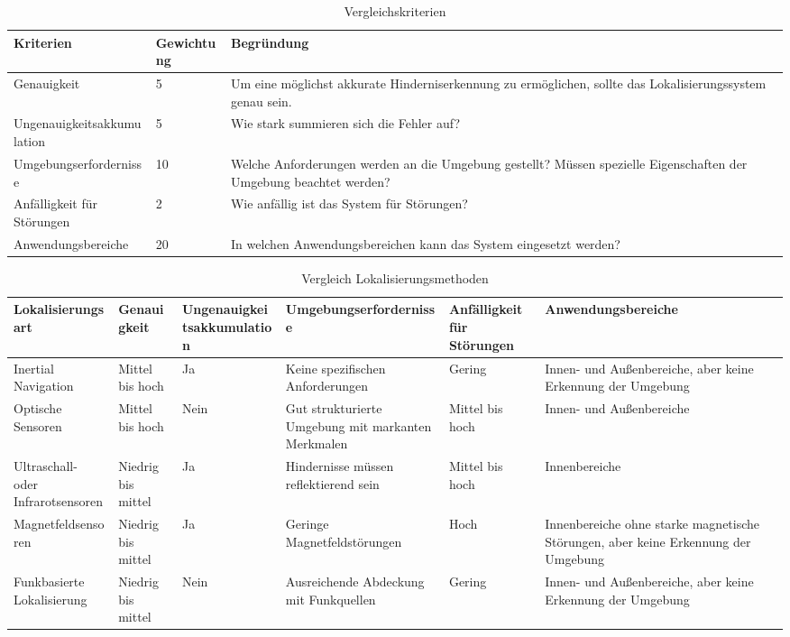 \begin{table}[H]
    \centering
    \begin{tabular}{|p{5cm}|p{5cm}|p{5cm}|}
        \hline
        \textbf{Kriterien} & \textbf{Gewichtung} & \textbf{Begründung} \\
        \hline
        Genauigkeit & 5 & Um eine möglichst akkurate Hinderniserkennung zu ermöglichen, sollte das Lokalisierungssystem genau sein. \\
        \hline
        Ungenauigkeitsakkumulation & 5 & Wie stark summieren sich die Fehler auf? \\
        \hline
        Umgebungserfordernisse & 10 & Welche Anforderungen werden an die Umgebung gestellt? Müssen spezielle Eigenschaften der Umgebung beachtet werden? \\
        \hline
        Anfälligkeit für Störungen & 2 & Wie anfällig ist das System für Störungen? \\
        \hline
        Anwendungsbereiche & 20 & In welchen Anwendungsbereichen kann das System eingesetzt werden? \\
        \hline
    \end{tabular}
    \caption{Vergleichskriterien}
    \label{tab:vergleich-kriterien}
\end{table}

\begin{table}[H]
\begin{center}
   \fontsize{7}{11}\selectfont
    \begin{tabular}{|p{2cm}|p{2cm}|p{2cm}|p{3cm}|p{2cm}|p{3cm}|}
    \hline
    \textbf{Lokalisier\-ungsart} & \textbf{Genauigkeit} & \textbf{Ungenauigkeits\-akkumulation} & \textbf{Umgebungs\-erfordernisse} & \textbf{Anfälligkeit für Störungen} & \textbf{Anwendungsbereiche} \\\hline
    Inertial Navigation & Mittel bis hoch & Ja & Keine spezifischen Anforderungen & Gering & Innen- und Außenbereiche, aber keine Erkennung der Umgebung \\\hline
    Optische Sensoren & Mittel bis hoch & Nein & Gut strukturierte Umgebung mit markanten Merkmalen & Mittel bis hoch & Innen- und Außenbereiche \\\hline
    Ultraschall- oder Infrarotsensoren & Niedrig bis mittel & Ja & Hindernisse müssen reflektierend sein & Mittel bis hoch & Innenbereiche \\\hline
    Magnetfeld\-sensoren & Niedrig bis mittel & Ja & Geringe Magnetfeldstörungen & Hoch & Innenbereiche ohne starke magnetische Störungen, aber keine Erkennung der Umgebung \\\hline
    Funkbasierte Lokalisierung & Niedrig bis mittel & Nein & Ausreichende Abdeckung mit Funkquellen & Gering & Innen- und Außenbereiche, aber keine Erkennung der Umgebung \\\hline
    \end{tabular}
    \caption{Vergleich Lokalisierungsmethoden}\label{tab:vergleich}
    \end{center}
\end{table}

